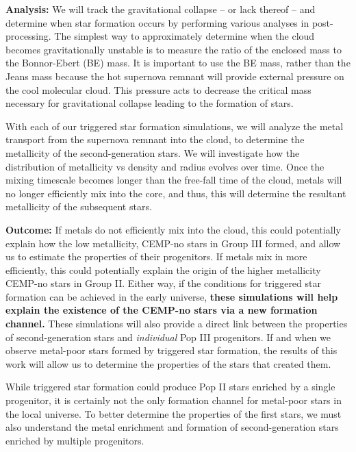 \documentclass[letterpaper, 12pt]{article}
\begin{document}
\textbf{Analysis:} We will track the gravitational collapse -- or lack thereof -- and determine when star formation occurs by performing various analyses in post-processing. The simplest way to approximately determine when the cloud becomes gravitationally unstable is to measure the ratio of the enclosed mass to the Bonnor-Ebert (BE) mass. It is important to use the BE mass, rather than the Jeans mass because the hot supernova remnant will provide external pressure on the cool molecular cloud. This pressure acts to decrease the critical mass necessary for gravitational collapse leading to the formation of stars.

With each of our triggered star formation simulations, we will analyze the metal transport from the supernova remnant into the cloud, to determine the metallicity of the second-generation stars. We will investigate how the distribution of metallicity vs density and radius evolves over time. Once the mixing timescale becomes longer than the free-fall time of the cloud, metals will no longer efficiently mix into the core, and thus, this will determine the resultant metallicity of the subsequent stars. 

\textbf{Outcome:} If metals do not efficiently mix into the cloud, this could potentially explain how the low metallicity, CEMP-no stars in Group III formed, and allow us to estimate the properties of their progenitors. If metals mix in more efficiently, this could potentially explain the origin of the higher metallicity CEMP-no stars in Group II. Either way, if the conditions for triggered star formation can be achieved in the early universe, \textbf{these simulations will help explain the existence of the CEMP-no stars via a new formation channel.} These simulations will also provide a direct link between the properties of second-generation stars and \textit{individual} Pop III progenitors. If and when we observe metal-poor stars formed by triggered star formation, the results of this work will allow us to determine the properties of the stars that created them.


While triggered star formation could produce Pop II stars enriched by a single progenitor, it is certainly not the only formation channel for metal-poor stars in the local universe. To better determine the properties of the first stars, we must also understand the metal enrichment and formation of second-generation stars enriched by multiple progenitors.
\end{document}
